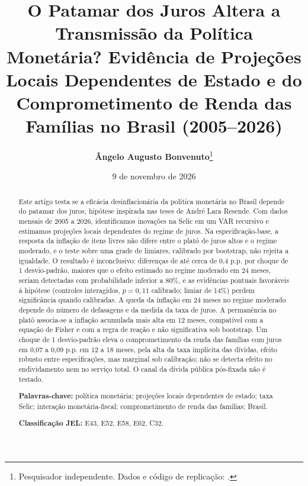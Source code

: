 \documentclass[12pt,a4paper]{article}
\title{\textbf{O Patamar dos Juros Altera a Transmissão da Política Monetária? Evidência de Projeções Locais Dependentes de Estado e do Comprometimento de Renda das Famílias no Brasil (2005--2026)}}
\author{}
\author{\textbf{Ângelo Augusto Bonvenuto}\thanks{Pesquisador independente. Dados e código de replicação: \repositorio.}}
\date{9 de novembro de 2026}
\begin{document}
\maketitle

\begin{abstract}
\noindent Este artigo testa se a eficácia desinflacionária da política monetária no Brasil depende do patamar dos juros, hipótese inspirada nas teses de André Lara Resende. Com dados mensais de 2005 a 2026, identificamos inovações na Selic em um VAR recursivo e estimamos projeções locais dependentes do regime de juros. Na especificação-base, a resposta da inflação de itens livres não difere entre o platô de juros altos e o regime moderado, e o teste sobre uma grade de limiares, calibrado por bootstrap, não rejeita a igualdade. O resultado é inconclusivo: diferenças de até cerca de 0,4 p.p. por choque de 1 desvio-padrão, maiores que o efeito estimado no regime moderado em 24 meses, seriam detectadas com probabilidade inferior a 80\%, e as evidências pontuais favoráveis à hipótese (controles interagidos, $p = 0{,}11$ calibrado; limiar de 14\%) perdem significância quando calibradas. A queda da inflação em 24 meses no regime moderado depende do número de defasagens e da medida da taxa de juros. A permanência no platô associa-se a inflação acumulada mais alta em 12 meses, compatível com a equação de Fisher e com a regra de reação e não significativa sob bootstrap. Um choque de 1 desvio-padrão eleva o comprometimento da renda das famílias com juros em 0,07 a 0,09 p.p. em 12 a 18 meses, pela alta da taxa implícita das dívidas, efeito robusto entre especificações, mas marginal sob calibração; não se detecta efeito no endividamento nem no serviço total. O canal da dívida pública pós-fixada não é testado.

\vspace{0.2cm}
\noindent \textbf{Palavras-chave:} política monetária; projeções locais dependentes de estado; taxa Selic; interação monetária-fiscal; comprometimento de renda das famílias; Brasil.

\vspace{0.15cm}
\noindent \textbf{Classificação JEL:} E43, E52, E58, E62, C32.
\end{abstract}

\vspace{0.25cm}
\end{document}
